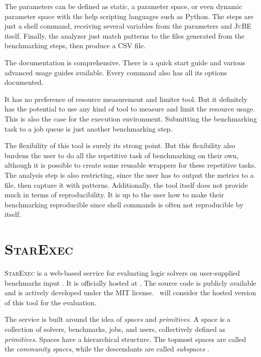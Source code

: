 The parameters can be defined as static, a parameter space, or even dynamic parameter space with the help scripting languages such as Python.
The steps are just a shell command, receiving several variables from the parameters and \textsc{JuBE} itself.
Finally, the analyzer just match patterns to the files generated from the benchmarking steps, then produce a CSV file.

The documentation is comprehensive.
There is a quick start guide and various advanced usage guides available.
Every command also has all its options documented.

It has no preference of resource measurement and limiter tool.
But it definitely has the potential to use any kind of tool to measure and limit the resource usage.
This is also the case for the execution environment.
Submitting the benchmarking task to a job queue is just another benchmarking step.

The flexibility of this tool is surely its strong point.
But this flexibility also burdens the user to do all the repetitive task of benchmarking on their own, although it is possible to create some reusable wrappers for these repetitive tasks.
The analysis step is also restricting, since the user has to output the metrics to a file, then capture it with patterns.
Additionally, the tool itself does not provide much in terms of reproducibility.
It is up to the user how to make their benchmarking reproducible since shell commands is often not reproducible by itself.


\section{\textsc{StarExec}}

\textsc{StarExec} is a web-based service for evaluating logic solvers on user-supplied benchmarks input \citep{stumpStarExecCrossCommunityInfrastructure2014}.
It is officially hosted at \href{https://www.starexec.org/}{}.
The source code is publicly available and is actively developed under the MIT license.
\First~will consider the hosted version of this tool for the evaluation.

The service is built around the idea of \emph{spaces} and \emph{primitives}.
A space is a collection of solvers, benchmarks, jobs, and users, collectively defined as \emph{primitives}.
Spaces have a hierarchical structure.
The topmost spaces are called the \emph{community spaces}, while the descendants are called \emph{subspaces} \citep{stumpStarExecCrossCommunityInfrastructure2014}.

